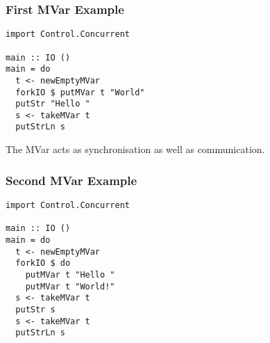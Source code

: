 \documentclass[notheorems]{beamer}%
\theoremstyle{definition}
\begin{document}
\begin{frame}[fragile]
  \frametitle{First MVar Example}
\begin{verbatim}
import Control.Concurrent

main :: IO ()
main = do
  t <- newEmptyMVar
  forkIO $ putMVar t "World"
  putStr "Hello "
  s <- takeMVar t
  putStrLn s
\end{verbatim}
  The MVar acts as \alert{synchronisation} as well as
  \alert{communication}.
\end{frame}

\begin{frame}[fragile]
  \frametitle{Second MVar Example}
\begin{verbatim}
import Control.Concurrent

main :: IO ()
main = do
  t <- newEmptyMVar
  forkIO $ do
    putMVar t "Hello "
    putMVar t "World!"
  s <- takeMVar t
  putStr s
  s <- takeMVar t
  putStrLn s
\end{verbatim}
\end{frame}
\end{document}
